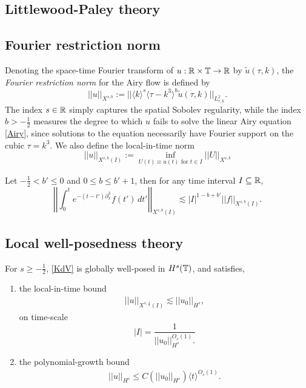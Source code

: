
\subsection{Littlewood-Paley theory}



\subsection{Fourier restriction norm}

Denoting the space-time Fourier transform of $u: \mathbb R \times \mathbb T \to \mathbb R$ by $\widetilde u(\tau, k)$, the \textit{Fourier restriction norm} for the Airy flow is defined by 
    \[
        ||u ||_{X^{s, b}}
            := || \langle k \rangle^s \langle \tau - k^3\rangle^b \widetilde u(\tau, k)||_{L^2_{\tau, k}}. 
    \]
The index $s \in \mathbb R$ simply captures the spatial Sobolev regularity, while the index $b> -\tfrac12$ measures the degree to which $u$ fails to solve the linear Airy equation \eqref{Airy}, since solutions to the equation necessarily have Fourier support on the cubic $\tau = k^3$. We also define the local-in-time norm 
    \[
        ||u||_{X^{s, b}(I)}
            := \inf_{U(t)\equiv u(t) \text{ for $t \in I$}} ||U||_{X^{s, b}}
    \]


\begin{lemma}
    Let $-\tfrac12 < b' \leq 0$ and $0 \leq b \leq b' + 1$, then for any time interval $I \subseteq \mathbb R$, 
        \begin{equation}\label{eq:Xsbsmooth}
            \left|\left| \int_0^t e^{- (t - t') \partial_x^3} f(t') \, dt' \right|\right|_{X^{s, b} (I) } 
                \lesssim |I|^{1 - b + b'} ||f||_{X^{s, b} (I)}.
        \end{equation}
\end{lemma}

\subsection{Local well-posedness theory}

\cite{CollianderEtAl2003}

\begin{theorem}
    For $s \geq -\tfrac12$, \eqref{KdV} is globally well-posed in $H^s (\mathbb T)$, and satisfies, 
    \begin{enumerate}
        \item the local-in-time bound
            \begin{align}\label{eq:LWP}
                ||u||_{X^{s, \frac12} (I)} 
                    \lesssim ||u_0||_{H^s}, 
            \end{align}
            on time-scale 
                \[|I| = \frac{1}{ ||u_0||_{H^s}^{O_s(1)}.}\]

        \item the polynomial-growth bound 
            \begin{align}\label{eq:high}
                ||u||_{H^s} 
                    \leq C(||u_0||_{H^s}) \langle t \rangle^{O_s(1)}. 
            \end{align}
    \end{enumerate}
\end{theorem}